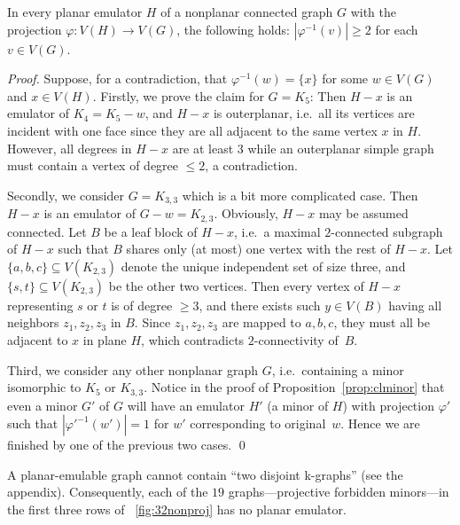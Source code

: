 \documentclass[envcountsect,envcountsame]{llncs}
\renewenvironment{accumulate}{}{}
\newenvironment{onlynoaccum}{}{}
\begin{document}
\begin{accumulate}
\begin{lemma}
\label{lem:enonplanar}
In every planar emulator $H$ of a nonplanar connected graph $G$
with the projection $\varphi:V(H)\to V(G)$, the following holds:
$|\varphi^{-1}(v)|\geq2$ for each $v\in V(G)$.
\end{lemma}

\begin{proof}
Suppose, for a contradiction, that $\varphi^{-1}(w)=\{x\}$ for some 
$w\in V(G)$ and $x\in V(H)$.
Firstly, we prove the claim for $G=K_5$:
Then $H-x$ is an emulator of $K_4=K_5-w$, and $H-x$ is outerplanar,
i.e.\ all its vertices are incident with one face since they are all adjacent to
the same vertex $x$ in $H$.
However, all degrees in $H-x$ are at least $3$ while an outerplanar simple graph
must contain a vertex of degree $\leq2$, a contradiction.

Secondly, we consider $G=K_{3,3}$ which is a bit more complicated case.
Then $H-x$ is an emulator of $G-w=K_{2,3}$.
Obviously, $H-x$ may be assumed connected.
Let $B$ be a leaf block of $H-x$, i.e.\ a maximal $2$-connected subgraph of
$H-x$ such that $B$ shares only (at most) one vertex with the rest of $H-x$.
Let $\{a,b,c\}\subseteq V(K_{2,3})$ denote the unique independent set
of size three, and $\{s,t\}\subseteq V(K_{2,3})$ be the other two vertices.
Then every vertex of $H-x$ representing $s$ or $t$ is of degree $\geq3$,
and there exists such $y\in V(B)$ having all neighbors $z_1,z_2,z_3$ in $B$.
Since $z_1,z_2,z_3$ are mapped to $a,b,c$, they must all be adjacent to $x$
in plane $H$, which contradicts $2$-connectivity of~$B$.

Third, we consider any other nonplanar graph $G$, i.e.\ containing a
minor isomorphic to $K_5$ or $K_{3,3}$.
Notice in the proof of Proposition~\ref{prop:clminor} that even a minor $G'$ of 
$G$ will have an emulator $H'$ (a minor of $H$) with projection $\varphi'$ such that
$|\varphi'^{-1}(w')|=1$ for $w'$ corresponding to original~$w$.
Hence we are finished by one of the previous two cases.
\qed\end{proof}

\end{accumulate}

\begin{onlynoaccum}
\begin{theorem}
\label{thm:2kgraphs}
A planar-emulable graph cannot contain ``two disjoint k-graphs''
(see the appendix).
Consequently, each of the $19$ graphs---projec\-tive forbidden minors---in the first three rows of \figurename~\ref{fig:32nonproj} 
has no planar emulator.
\end{theorem}
\end{onlynoaccum}
\end{document}
